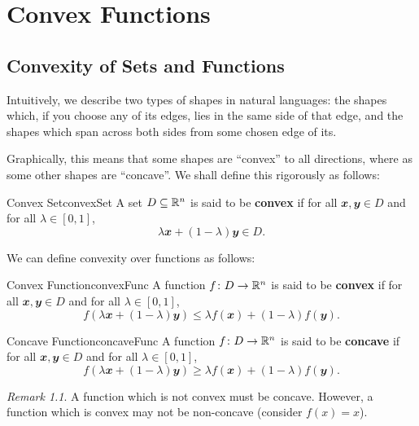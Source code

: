 \documentclass[math, code]{amznotes}
\theoremstyle{remark}
\newtheorem*{remark}{Remark}
\begin{document}
\chapter{Convex Functions}
\section{Convexity of Sets and Functions}
Intuitively, we describe two types of shapes in natural languages: the shapes which, if you choose any of its edges, lies in the same side of that edge, and the shapes which span across both sides from some chosen edge of its.

Graphically, this means that some shapes are ``convex'' to all directions, where as some other shapes are ``concave''. We shall define this rigorously as follows:
\begin{dfnbox}{Convex Set}{convexSet}
    A set $D \subseteq \mathbb{R}^n$ is said to be {\color{red} \textbf{convex}} if for all $\mathbfit{x}, \mathbfit{y} \in D$ and for all $\lambda \in [0, 1]$, 
    \begin{displaymath}
        \lambda \mathbfit{x} + (1 - \lambda)\mathbfit{y} \in D.
    \end{displaymath}
\end{dfnbox}
We can define convexity over functions as follows:
\begin{dfnbox}{Convex Function}{convexFunc}
    A function $f \colon D \to \mathbb{R}^n$ is said to be {\color{red} \textbf{convex}} if for all $\mathbfit{x}, \mathbfit{y} \in D$ and for all $\lambda \in [0, 1]$, 
    \begin{displaymath}
        f\left(\lambda \mathbfit{x} + (1 - \lambda)\mathbfit{y}\right) \leq \lambda f(\mathbfit{x}) + (1 - \lambda)f(\mathbfit{y}).
    \end{displaymath}
\end{dfnbox}
\begin{dfnbox}{Concave Function}{concaveFunc}
    A function $f \colon D \to \mathbb{R}^n$ is said to be {\color{red} \textbf{concave}} if for all $\mathbfit{x}, \mathbfit{y} \in D$ and for all $\lambda \in [0, 1]$, 
    \begin{displaymath}
        f\left(\lambda \mathbfit{x} + (1 - \lambda)\mathbfit{y}\right) \geq \lambda f(\mathbfit{x}) + (1 - \lambda)f(\mathbfit{y}).
    \end{displaymath}
\end{dfnbox}
\begin{notebox}
    \begin{remark}
        A function which is not convex must be concave. However, a function which is convex may not be non-concave (consider $f(x) = x$).
    \end{remark}
\end{notebox}
\end{document}
